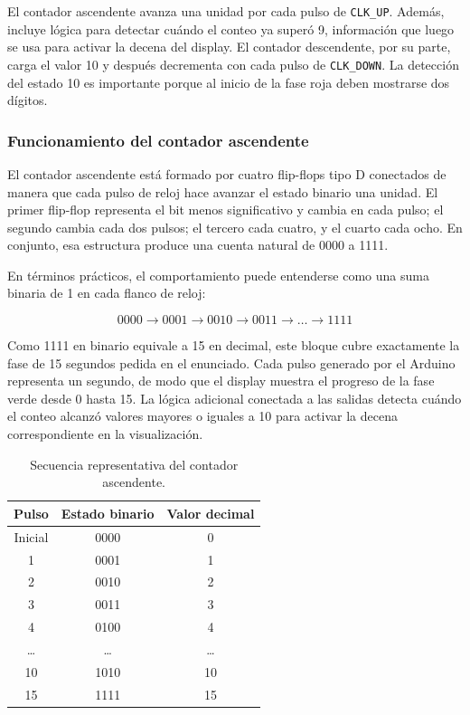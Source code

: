 \documentclass[12pt,a4paper]{article}
\begin{document}
El contador ascendente avanza una unidad por cada pulso de \texttt{CLK\_UP}. Además, incluye lógica para detectar cuándo el conteo ya superó 9, información que luego se usa para activar la decena del display. El contador descendente, por su parte, carga el valor 10 y después decrementa con cada pulso de \texttt{CLK\_DOWN}. La detección del estado 10 es importante porque al inicio de la fase roja deben mostrarse dos dígitos.

\subsubsection{Funcionamiento del contador ascendente}
El contador ascendente está formado por cuatro flip-flops tipo D conectados de manera que cada pulso de reloj hace avanzar el estado binario una unidad. El primer flip-flop representa el bit menos significativo y cambia en cada pulso; el segundo cambia cada dos pulsos; el tercero cada cuatro, y el cuarto cada ocho. En conjunto, esa estructura produce una cuenta natural de 0000 a 1111.

En términos prácticos, el comportamiento puede entenderse como una suma binaria de 1 en cada flanco de reloj:

\[
0000 \rightarrow 0001 \rightarrow 0010 \rightarrow 0011 \rightarrow \dots \rightarrow 1111
\]

Como 1111 en binario equivale a 15 en decimal, este bloque cubre exactamente la fase de 15 segundos pedida en el enunciado. Cada pulso generado por el Arduino representa un segundo, de modo que el display muestra el progreso de la fase verde desde 0 hasta 15. La lógica adicional conectada a las salidas detecta cuándo el conteo alcanzó valores mayores o iguales a 10 para activar la decena correspondiente en la visualización.

\begin{table}[H]
    \centering
    \caption{Secuencia representativa del contador ascendente.}
    \begin{tabular}{c c c}
        \toprule
        \textbf{Pulso} & \textbf{Estado binario} & \textbf{Valor decimal} \\
        \midrule
        Inicial & 0000 & 0 \\
        1 & 0001 & 1 \\
        2 & 0010 & 2 \\
        3 & 0011 & 3 \\
        4 & 0100 & 4 \\
        \dots & \dots & \dots \\
        10 & 1010 & 10 \\
        15 & 1111 & 15 \\
        \bottomrule
    \end{tabular}
\end{table}
\end{document}
